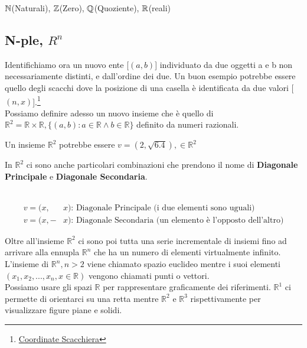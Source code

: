$\mathbb{\MakeUppercase{n}}$(Naturali), $\mathbb{\MakeUppercase{z}}$(Zero), $\mathbb{\MakeUppercase{q}}$(Quoziente), $\mathbb{\MakeUppercase{r}}$(reali)

\subsection{N-ple, $R^n$}

Identifichiamo ora un nuovo ente [$(a,b)$] individuato da due oggetti a e b non necessariamente distinti, e dall'ordine dei due. Un buon esempio potrebbe essere quello degli scacchi dove la posizione di una casella è identificata da due valori [$(n,x)$].\footnote{\href{https://upload.wikimedia.org/wikipedia/commons/thumb/b/b6/SCD_algebraic_notation.svg/1200px-SCD_algebraic_notation.svg.png}{Coordinate Scacchiera}}
\leavevmode\\
Possiamo definire adesso un nuovo insieme che è quello di $\mathbb{R}^{2}=\mathbb{R}\times \mathbb{R}, \{(a,b):a\in \mathbb{R} \wedge b\in \mathbb{R}\}$ definito da numeri razionali.
\begin{es}
	Un insieme $\mathbb{R}^{2}$ potrebbe essere $v=(2,\sqrt{6.4}), \in \mathbb{R}^{2}$
\end{es}

\begin{nota}
	In $\mathbb{R}^{2}$ ci sono anche particolari combinazioni che prendono il nome di \textbf{Diagonale Principale} e \textbf{Diagonale Secondaria}.
	\begin{es}
		\phantom{}\\
		\begin{align*}
			v=(x,&x) \text{: Diagonale Principale (i due elementi sono uguali)}\\
			v=(x,-&x) \text{: Diagonale Secondaria (un elemento è l'opposto dell'altro)}
		\end{align*}
	\end{es}
\end{nota}

Oltre all'insieme $\mathbb{R}^{2}$ ci sono poi tutta una serie incrementale di insiemi fino ad arrivare alla ennupla $\mathbb{R}^{n}$ che ha un numero di elementi virtualmente infinito. L'insieme di $\mathbb{R}^{n}, n>2$ viene chiamato spazio euclideo mentre i suoi elementi $(x_{1},x_{2},...,x_{n}, x\in \mathbb{R})$ vengono chiamati punti o vettori.\\
Possiamo usare gli spazi $\mathbb{R}$ per rappresentare graficamente dei riferimenti. $\mathbb{R}^{1}$ ci permette di orientarci su una retta mentre $\mathbb{R}^{2}$ e $\mathbb{R}^{3}$ rispettivamente per visualizzare figure piane e solidi.


